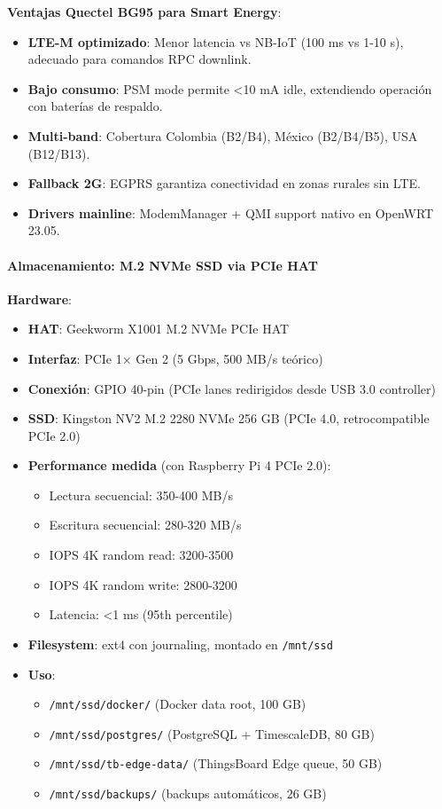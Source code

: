 \textbf{Ventajas Quectel BG95 para Smart Energy}:
\begin{itemize}
    \item \textbf{LTE-M optimizado}: Menor latencia vs NB-IoT (100 ms vs 1-10 s), adecuado para comandos RPC downlink.
    \item \textbf{Bajo consumo}: PSM mode permite <10 mA idle, extendiendo operación con baterías de respaldo.
    \item \textbf{Multi-band}: Cobertura Colombia (B2/B4), México (B2/B4/B5), USA (B12/B13).
    \item \textbf{Fallback 2G}: EGPRS garantiza conectividad en zonas rurales sin LTE.
    \item \textbf{Drivers mainline}: ModemManager + QMI support nativo en OpenWRT 23.05.
\end{itemize}

\paragraph{Almacenamiento: M.2 NVMe SSD via PCIe HAT}

\textbf{Hardware}:
\begin{itemize}
    \item \textbf{HAT}: Geekworm X1001 M.2 NVMe PCIe HAT
    \item \textbf{Interfaz}: PCIe 1$\times$ Gen 2 (5 Gbps, 500 MB/s teórico)
    \item \textbf{Conexión}: GPIO 40-pin (PCIe lanes redirigidos desde USB 3.0 controller)
    \item \textbf{SSD}: Kingston NV2 M.2 2280 NVMe 256 GB (PCIe 4.0, retrocompatible PCIe 2.0)
    \item \textbf{Performance medida} (con Raspberry Pi 4 PCIe 2.0):
    \begin{itemize}
        \item Lectura secuencial: 350-400 MB/s
        \item Escritura secuencial: 280-320 MB/s
        \item IOPS 4K random read: 3200-3500
        \item IOPS 4K random write: 2800-3200
        \item Latencia: <1 ms (95th percentile)
    \end{itemize}
    \item \textbf{Filesystem}: ext4 con journaling, montado en \texttt{/mnt/ssd}
    \item \textbf{Uso}:
    \begin{itemize}
        \item \texttt{/mnt/ssd/docker/} (Docker data root, 100 GB)
        \item \texttt{/mnt/ssd/postgres/} (PostgreSQL + TimescaleDB, 80 GB)
        \item \texttt{/mnt/ssd/tb-edge-data/} (ThingsBoard Edge queue, 50 GB)
        \item \texttt{/mnt/ssd/backups/} (backups automáticos, 26 GB)
    \end{itemize}
\end{itemize}

